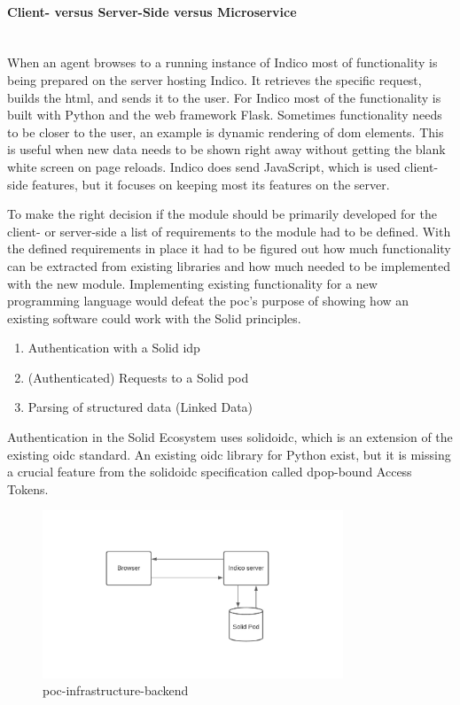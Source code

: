 \paragraph{Client- versus Server-Side versus Microservice}\mbox{}\\

When an agent browses to a running instance of Indico most of functionality is being prepared on the server hosting Indico. It retrieves the specific request, builds the \gls{html}, and sends it to the user. For Indico most of the functionality is built with Python and the web framework Flask. Sometimes functionality needs to be closer to the user, an example is dynamic rendering of \gls{dom} elements. This is useful when new data needs to be shown right away without getting the blank white screen on page reloads.
Indico does send JavaScript, which is used client-side features, but it focuses on keeping most its features on the server.

To make the right decision if the module should be primarily developed for the client- or server-side a list of requirements to the module had to be defined. With the defined requirements in place it had to be figured out how much functionality can be extracted from existing libraries and how much needed to be implemented with the new module. Implementing existing functionality for a new programming language would defeat the \gls{poc}’s purpose of showing how an existing software could work with the Solid principles.

\begin{enumerate}
    \item Authentication with a Solid \gls{idp}
    \item (Authenticated) Requests to a Solid pod
    \item Parsing of structured data (Linked Data)
\end{enumerate}

Authentication in the Solid Ecosystem uses \gls{solidoidc}, which is an extension of the existing \gls{oidc} standard. An existing \gls{oidc} library for Python exist, but it is missing a crucial feature from the \gls{solidoidc} specification called \gls{dpop}-bound Access Tokens.

\begin{figure}
    \centering
    \includegraphics[width=0.8\textwidth]{prototype/graphs/poc-infrastructure-backend.jpeg}
    \caption{poc-infrastructure-backend}
    \label{fig:poc-infrastructure-backend}
\end{figure}

